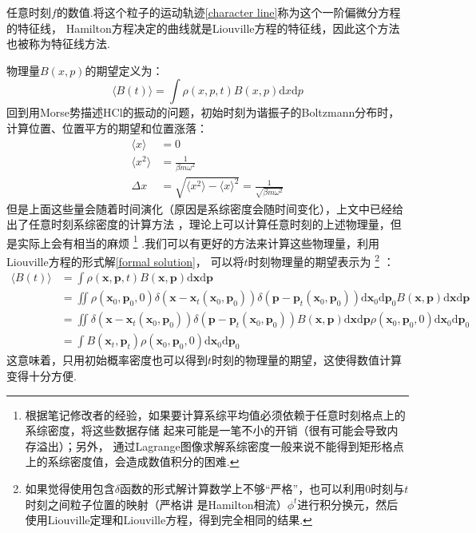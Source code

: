     任意时刻$f$的数值.将这个粒子的运动轨迹\ref{character line}称为这个一阶偏微分方程的特征线，
    Hamilton方程决定的曲线就是Liouville方程的特征线，因此这个方法也被称为特征线方法.
    \par
    物理量$B(x, p)$的期望定义为：
    \begin{equation}
        \langle B(t) \rangle = \int \rho(x,p,t) B(x,p) \mathrm{d}x\mathrm{d}p
    \end{equation}
    回到用Morse势描述HCl的振动的问题，初始时刻为谐振子的Boltzmann分布时，计算位置、位置平方的期望和位置涨落：
    \begin{equation}
        \begin{split}
            \langle x \rangle &= 0\\
            \langle x^2 \rangle &= \frac 1{\beta m \omega^2}\\
            \Delta x &= \sqrt{\langle x^2 \rangle - \langle x \rangle ^2} = \frac 1{\sqrt{\beta m \omega^2}}
        \end{split}
    \end{equation}
    但是上面这些量会随着时间演化（原因是系综密度会随时间变化），上文中已经给出了任意时刻系综密度的计算方法
    ，理论上可以计算任意时刻的上述物理量，但是实际上会有相当的麻烦
    \footnote{
        根据笔记修改者的经验，如果要计算系综平均值必须依赖于任意时刻格点上的系综密度，将这些数据存储
        起来可能是一笔不小的开销（很有可能会导致内存溢出）；另外，
        通过Lagrange图像求解系综密度一般来说不能得到矩形格点上的系综密度值，会造成数值积分的困难.
    }
    .我们可以有更好的方法来计算这些物理量，利用Liouville方程的形式解\ref{formal solution}，
    可以将$t$时刻物理量的期望表示为
    \footnote{
        如果觉得使用包含$\delta$函数的形式解计算数学上不够“严格”，也可以利用0时刻与$t$时刻之间粒子位置的映射（严格讲
        是Hamilton相流）$\phi^t$进行积分换元，然后使用Liouville定理和Liouville方程，得到完全相同的结果.
    }
    ：
    \begin{equation}
        \begin{split}
            \langle B(t) \rangle &= \int \rho(\bm{x},\bm{p},t) B(\bm{x},\bm{p}) \mathrm{d}\bm{x}\mathrm{d}\bm{p}\\
            &= \iint \rho(\bm{x}_0,\bm{p}_0,0)\delta(\bm{x}-\bm{x}_t(\bm{x}_0,\bm{p}_0)) \delta(\bm{p}-\bm{p}_t(\bm{x}_0,\bm{p}_0)) \mathrm{d}\bm{x}_0\mathrm{d}\bm{p}_0 B(\bm{x},\bm{p}) \mathrm{d}\bm{x}\mathrm{d}\bm{p}\\
            &= \iint \delta(\bm{x}-\bm{x}_t(\bm{x}_0,\bm{p}_0)) \delta(\bm{p}-\bm{p}_t(\bm{x}_0,\bm{p}_0)) B(\bm{x},\bm{p}) \mathrm{d}\bm{x}\mathrm{d}\bm{p} \rho(\bm{x}_0,\bm{p}_0,0) \mathrm{d}\bm{x}_0\mathrm{d}\bm{p}_0\\
            &= \int B(\bm{x}_t,\bm{p}_t) \rho(\bm{x}_0,\bm{p}_0,0)\mathrm{d}\bm{x}_0\mathrm{d}\bm{p}_0
        \end{split}
    \end{equation}
    这意味着，只用初始概率密度也可以得到$t$时刻的物理量的期望，这使得数值计算变得十分方便.

